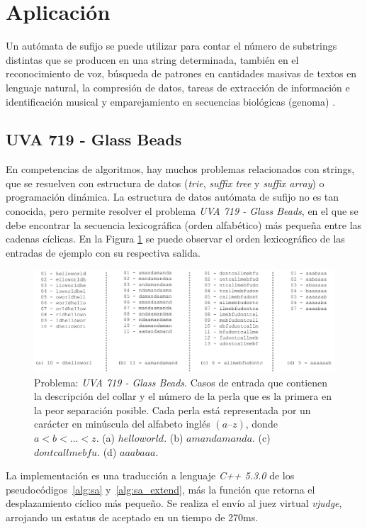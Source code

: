 \section{Aplicación}\label{Application}
Un autómata de sufijo se puede utilizar para contar el número de \glspl{substring} distintas que se producen en una \gls{string} determinada, también en el reconocimiento de voz, búsqueda de patrones en cantidades masivas de textos en lenguaje natural, la compresión de datos, tareas de extracción de información e identificación musical y emparejamiento en secuencias biológicas (genoma) \cite{wiki:Suffix_automaton}.

\subsection{UVA 719 - Glass Beads}
En competencias de algoritmos, hay muchos problemas relacionados con \glspl{string}, que se resuelven con estructura de datos (\textit{trie}, \textit{suffix tree} y \textit{suffix array}) o programación dinámica. La estructura de datos autómata de sufijo no es tan conocida, pero permite resolver el problema \textit{UVA 719 - Glass Beads}, en el que se debe encontrar la secuencia lexicográfica (orden alfabético) más pequeña entre las cadenas cíclicas. En la Figura \ref{fig:UVA-719-Input-Output} se puede observar el orden lexicográfico de las entradas de ejemplo con su respectiva salida.

\begin{figure}[H]
	\centering
	\includegraphics[width=1\linewidth]{doc/Application/img/cases-necklace}
	\caption{Problema: \textit{UVA 719 - Glass Beads}. Casos de entrada que contienen la descripción del collar y el número de la perla que es la primera en la peor separación posible. Cada perla está representada por un carácter en minúscula del alfabeto inglés $(a–z)$, donde $a < b < ... < z$. (a) $helloworld$. (b) $amandamanda$. (c) $dontcallmebfu$. (d) $aaabaaa$. }
	\label{fig:UVA-719-Input-Output}
\end{figure}

La implementación es una traducción a lenguaje \textit{C++ 5.3.0} de los pseudocódigos~\ref{alg:sa} y~\ref{alg:sa_extend}, más la función que retorna el desplazamiento cíclico más pequeño. Se realiza el envío al juez virtual \textit{vjudge}, arrojando un estatus de aceptado en un tiempo de 270ms.


